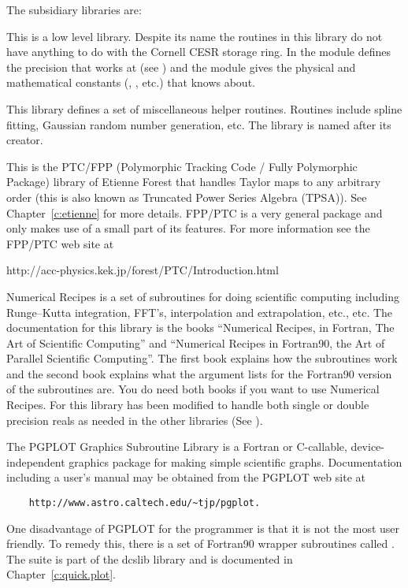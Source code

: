 The subsidiary libraries are: 
\begin{description}
\item[cesr_utils] 
This is a low level library. Despite its name the
routines in this library do not have anything to do with the Cornell
CESR storage ring.  In  the module 
defines the precision that \bmad works at (see
) and the module 
gives the physical and mathematical constants (, ,
etc.) that \bmad knows about.

\item[dcslib] 
This library defines a set of miscellaneous helper
routines.  Routines include spline fitting, Gaussian random number
generation, etc. The library is named after its creator.

\item[forest] 
This is the PTC/FPP (Polymorphic Tracking Code /
Fully Polymorphic Package) library of Etienne Forest that handles
Taylor maps to any arbitrary order (this is also known as Truncated
Power Series Algebra (TPSA)). See Chapter~\ref{c:etienne} for more
details.  FPP/PTC is a very general package and \bmad only makes use
of a small part of its features.  For more information see the FPP/PTC
web site at
\begin{example} 
   http://acc-physics.kek.jp/forest/PTC/Introduction.html
\end{example}

\item[recipes] 
Numerical Recipes is a set of subroutines for doing
scientific computing including Runge--Kutta integration, FFT's,
interpolation and extrapolation, etc., etc. The documentation for this
library is the books ``Numerical Recipes, in Fortran, The Art of
Scientific Computing'' and ``Numerical Recipes in
Fortran90, the Art of Parallel Scientific Computing''\cite{b:nr}.
The first book explains how the subroutines work and the second book
explains what the argument lists for the Fortran90 version of the
subroutines are. You do need both books if you want to use Numerical
Recipes. For \bmad this library has been modified to handle both
single or double precision reals as needed in the other libraries (See
).

\item[PGPLOT] 
The PGPLOT Graphics Subroutine Library is a Fortran or
C-callable, device-independent graphics package for making simple
scientific graphs. Documentation including a user's manual may be
obtained from the PGPLOT web site at
\begin{verbatim}
    http://www.astro.caltech.edu/~tjp/pgplot.
\end{verbatim} 
One disadvantage of PGPLOT for the programmer is that it is not the
most user friendly. To remedy this, there is a set of Fortran90
wrapper subroutines called .  The 
suite is part of the dcslib library and is documented in
Chapter~\ref{c:quick.plot}.


\end{description}

